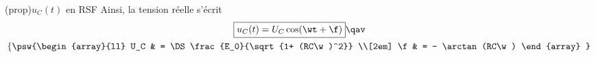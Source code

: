 \documentclass[../../main/main.tex]{subfiles}
\begin{document}
\begin{tcb*}[sidebyside, righthand ratio=.6](prop){$u_C(t)$ en RSF}
	Ainsi, la tension réelle s'écrit
	\begin{gather*}
		\boxed{u_C(t) = U_C \cos(\wt + \f)} \qav
		\\
		\left\{
		\psw{%
			\begin{array}{ll}
				U_C & = \DS\frac{E_0}{\sqrt{1+ (RC\w)^2}}
				\\[2em]
				\f  & = - \arctan(RC\w)
			\end{array}
		}%
		\right.
	\end{gather*}
	\tcblower
	\noindent
	\begin{minipage}[t]{.48\linewidth}
		\vspace{0pt}
		\begin{center}
\end{center}
\end{minipage}
\end{tcb*}
\end{document}
